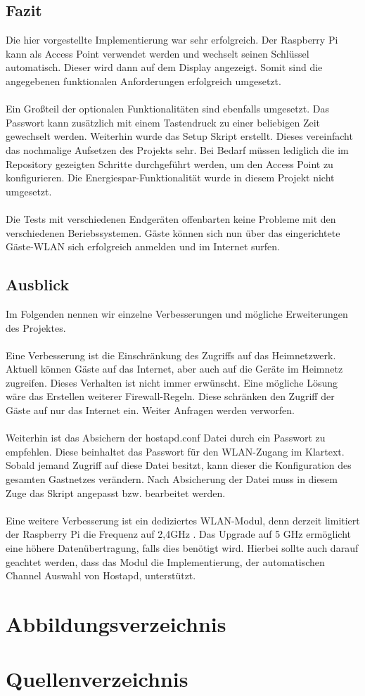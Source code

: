 \documentclass[a4paper,11pt,singlespacing]{article}
\begin{document}
	    \subsection{Fazit}
	    	Die hier vorgestellte Implementierung war sehr erfolgreich. Der Raspberry Pi kann als Access Point verwendet werden und wechselt seinen Schlüssel automatisch. Dieser wird dann auf dem Display angezeigt. Somit sind die angegebenen funktionalen Anforderungen erfolgreich umgesetzt. \\ \\ 
	    	Ein Großteil der optionalen Funktionalitäten sind ebenfalls umgesetzt. Das Passwort kann zusätzlich mit einem Tastendruck zu einer beliebigen Zeit gewechselt werden. Weiterhin wurde das Setup Skript erstellt. Dieses vereinfacht das nochmalige Aufsetzen des Projekts sehr. Bei Bedarf müssen lediglich die im Repository \cite{Quote_github_repo} gezeigten Schritte durchgeführt werden, um den Access Point zu konfigurieren. Die Energiespar-Funktionalität wurde in diesem Projekt nicht umgesetzt.\\ \\
	    	Die Tests mit verschiedenen Endgeräten offenbarten keine Probleme mit den verschiedenen Beriebssystemen. Gäste können sich nun über das eingerichtete Gäste-WLAN sich erfolgreich anmelden und im Internet surfen.\\
	    \subsection{Ausblick}
	    	Im Folgenden nennen wir einzelne Verbesserungen und mögliche Erweiterungen des Projektes. \\ \\
	    	Eine Verbesserung ist die Einschränkung des Zugriffs auf das Heimnetzwerk. Aktuell können Gäste auf das Internet, aber auch auf die Geräte im Heimnetz zugreifen. Dieses Verhalten ist nicht immer erwünscht. Eine mögliche Lösung wäre das Erstellen weiterer Firewall-Regeln. Diese schränken den Zugriff der Gäste auf nur das Internet ein. Weiter Anfragen werden verworfen.\\ \\
	    	Weiterhin ist das Absichern der hostapd.conf Datei durch ein Passwort zu empfehlen. Diese beinhaltet das Passwort für den WLAN-Zugang im Klartext. Sobald jemand Zugriff auf diese Datei besitzt, kann dieser die Konfiguration des gesamten Gastnetzes verändern. Nach Absicherung der Datei muss in diesem Zuge das Skript angepasst bzw. bearbeitet werden. \\ \\
	    	Eine weitere Verbesserung ist ein dediziertes WLAN-Modul, denn derzeit limitiert der Raspberry Pi die Frequenz auf 2,4GHz \cite{Quote_Raspberrypi3b}. Das Upgrade auf	 5 GHz ermöglicht eine höhere Datenübertragung, falls dies benötigt wird. Hierbei sollte auch darauf geachtet werden, dass das Modul die Implementierung, der automatischen Channel Auswahl von Hostapd, unterstützt.
    
    
   	\pagebreak
   	\section{Abbildungsverzeichnis}
   	\listoffigures
   	\section{Quellenverzeichnis}
    
    
    	
\clearpage
\end{document}
